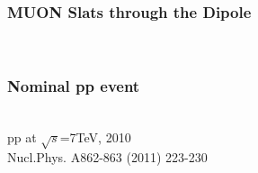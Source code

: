 \documentclass{beamer}
\begin{document}
\begin{frame}
\frametitle{MUON Slats through the Dipole}
 \\

\end{frame}

\begin{frame}
  \frametitle{Nominal pp event}
 \\
pp at $\sqrt{s}$=7TeV, 2010 \\
Nucl.Phys. A862-863 (2011) 223-230
\end{frame}
\end{document}
